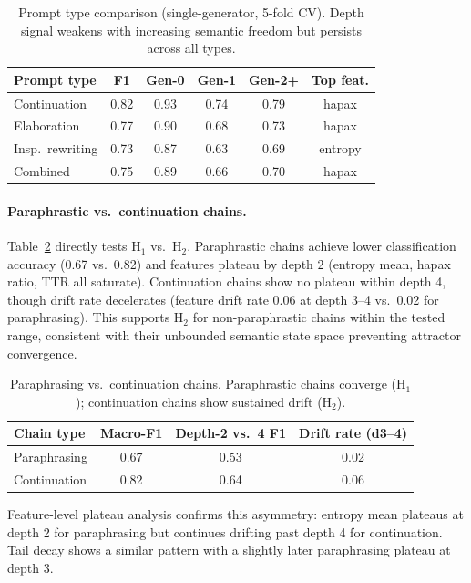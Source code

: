 \documentclass[letterpaper,11pt]{article}
\begin{document}
\begin{table}[t]
\centering
\caption{Prompt type comparison (single-generator, 5-fold CV). Depth signal weakens with increasing semantic freedom but persists across all types.}
\label{tab:prompt}
\small
\begin{tabular}{lccccc}
\toprule
Prompt type & F1 & Gen-0 & Gen-1 & Gen-2+ & Top feat. \\
\midrule
Continuation & 0.82 & 0.93 & 0.74 & 0.79 & hapax \\
Elaboration & 0.77 & 0.90 & 0.68 & 0.73 & hapax \\
Insp.\ rewriting & 0.73 & 0.87 & 0.63 & 0.69 & entropy \\
Combined & 0.75 & 0.89 & 0.66 & 0.70 & hapax \\
\bottomrule
\end{tabular}
\end{table}

\paragraph{Paraphrastic vs.\ continuation chains.} Table~\ref{tab:para} directly tests H$_1$ vs.\ H$_2$. Paraphrastic chains achieve lower classification accuracy (0.67 vs.\ 0.82) and features plateau by depth 2 (entropy mean, hapax ratio, TTR all saturate). Continuation chains show no plateau within depth 4, though drift rate decelerates (feature drift rate 0.06 at depth 3--4 vs.\ 0.02 for paraphrasing). This supports H$_2$ for non-paraphrastic chains within the tested range, consistent with their unbounded semantic state space preventing attractor convergence.

\begin{table}[t]
\centering
\caption{Paraphrasing vs.\ continuation chains. Paraphrastic chains converge (H$_1$); continuation chains show sustained drift (H$_2$).}
\label{tab:para}
\small
\begin{tabular}{lccc}
\toprule
Chain type & Macro-F1 & Depth-2 vs.\ 4 F1 & Drift rate (d3--4) \\
\midrule
Paraphrasing & 0.67 & 0.53 & 0.02 \\
Continuation & 0.82 & 0.64 & 0.06 \\
\bottomrule
\end{tabular}
\end{table}

Feature-level plateau analysis confirms this asymmetry: entropy mean plateaus at depth 2 for paraphrasing but continues drifting past depth 4 for continuation. Tail decay shows a similar pattern with a slightly later paraphrasing plateau at depth 3.
\end{document}
